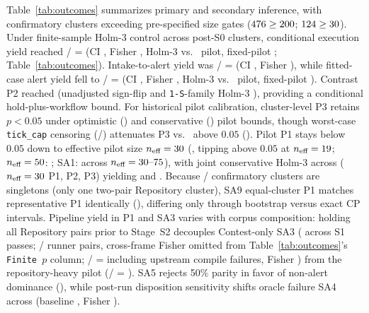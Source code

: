\documentclass[11pt]{article}
\begin{document}
Table~\ref{tab:outcomes} summarizes primary and secondary inference, with confirmatory clusters exceeding pre-specified size gates ($476{} \ge 200{}$; $124{} \ge 30{}$).
Under finite-sample Holm-3 control across \BenchConfClustersN{} post-S0 clusters, conditional execution yield reached \BenchPOneCount{}/\BenchConfClustersN{} = \BenchPOnePct{} (CI \BenchPOneCI{}, Fisher \BenchPOneFisherP{}, Holm-3 \BenchFinHolmPOne{} vs.\ \BenchPilotExecPct{} pilot, fixed-pilot \BenchPOneHolmP{}; Table~\ref{tab:outcomes}).
Intake-to-alert yield was \BenchPThreeCount{}/\BenchConfClustersN{} = \BenchSATwoPct{} (CI \BenchSATwoCI{}, Fisher \BenchSATwoFisherP{}), while fitted-case alert yield fell to \BenchPThreeCount{}/\BenchFittedClusters{} = \BenchPThreePct{} (CI \BenchPThreeCI{}, Fisher \BenchPThreeFisherP{}, Holm-3 \BenchFinHolmPThree{} vs.\ \BenchPilotAlertPct{} pilot, fixed-pilot \BenchPThreeHolmP{}).
Contrast P2 reached \BenchDeskContrast{} (unadjusted sign-flip and \texttt{1-S}-family Holm-3 \BenchPTwoHolmP{}), providing a conditional hold-plus-workflow bound.
For historical pilot calibration, cluster-level P3 retains $p < 0.05$ under optimistic \BenchPilotFitClustersFrac{} (\BenchPThreePilotClustFisherP{}) and conservative \BenchPilotConservFrac{} (\BenchPThreePilotClustConservP{}) pilot bounds, though worst-case \texttt{tick\_cap} censoring (\BenchCensorWorstN{}/\BenchCensorDenom{}) attenuates P3 vs.\ \BenchPilotConservFrac{} above $0.05$ (\BenchCensorWorstFisherConservP{}).
Pilot P1 stays below $0.05$ down to effective pilot size $n_{\text{eff}} = 30{}$ (\BenchPOnePilotNeffThirtyP{}, tipping above $0.05$ at $n_{\text{eff}} = 19{}$; $n_{\text{eff}}=50{}$: \BenchPOnePilotNeffFiftyP{}; SA1: \BenchSAOnePilotNeffRangeP{} across $n_{\text{eff}} = 30\text{--}75{}$), with joint conservative Holm-3 across ($n_{\text{eff}}=30{}$ P1, P2, \BenchPilotConservFrac{} P3) yielding \BenchJointConservHolmPOne{} and \BenchJointConservHolmPThree{}.
Because \BenchConfSingletonN{}/\BenchConfClustersN{} confirmatory clusters are singletons (only one two-pair Repository cluster), SA9 equal-cluster P1 matches representative P1 identically (\BenchPOnePct{}), differing only through bootstrap versus exact CP intervals.
Pipeline yield in P1 and SA3 varies with corpus composition: holding all Repository pairs prior to Stage~S2 decouples Contest-only SA3 (\BenchSAThreeAllSPass{} across S1 passes; \BenchFlowPrepC{}/\BenchRunnerSOnePassN{} runner pairs, cross-frame Fisher \BenchSAThreeCrossFrameP{} omitted from Table~\ref{tab:outcomes}'s \texttt{Finite $p$} column; \BenchSAThreeInclCompileN{}/\BenchConfSTwoPassN{} = \BenchSAThreeInclCompilePct{} including upstream compile failures, Fisher \BenchSAThreeInclCompileP{}) from the repository-heavy pilot (\BenchPilotPrepN{}/\BenchPilotPrepDenom{} = \BenchPilotPrepPct{}).
SA5 rejects 50\% parity in favor of non-alert dominance (\BenchSAFiveSignP{}), while post-run disposition sensitivity shifts oracle failure SA4 across \BenchEnvSAFourRange{} (baseline \BenchOracleFailPct{}, Fisher \BenchSAFourFisherP{}).
\end{document}
